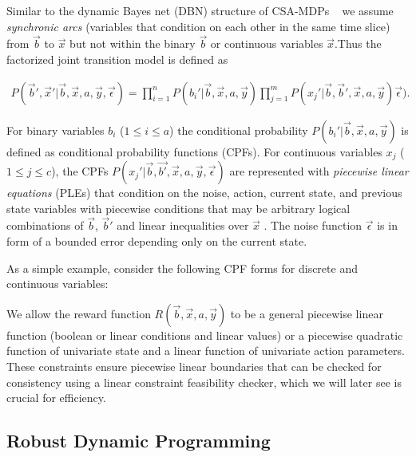  
Similar to the dynamic Bayes net (DBN) structure of CSA-MDPs ~\cite{sdp_aaai} 
we assume \emph{synchronic arcs} (variables that condition on each
other in the same time slice) from $\vec{b}$ to $\vec{x}$ but not within the binary $\vec{b}$ or continuous variables $\vec{x}$.Thus the factorized joint transition model is defined as

{\footnotesize
\begin{align}
 P(\vec{b}',\vec{x}'|\vec{b},\vec{x}, a,\vec{y},\vec{\epsilon}) = \prod_{i=1}^n P(b_i'|\vec{b},\vec{x} ,a,\vec{y}) 
\prod_{j=1}^m P(x_j'|\vec{b},\vec{b}',\vec{x},a,\vec{y}) \vec{\epsilon}).  \nonumber
\end{align}
}

For binary variables $b_i$ ($1 \leq i \leq a$) the conditional probability $P(b_i'|\vec{b},\vec{x},a,\vec{y})$ is defined as 
conditional probability functions (CPFs).  For continuous variables $x_j$ ($1 \leq j \leq c$), the CPFs
$P(x_j'|\vec{b},\vec{b'},\vec{x},a,\vec{y},\vec{\epsilon})$ are represented with \emph{piecewise linear equations} (PLEs) that condition on the
noise, action, current state, and previous state variables with piecewise conditions that may be arbitrary logical combinations of $\vec{b}$, $\vec{b}'$  and linear inequalities over $\vec{x}$ .  The noise function $\vec{\epsilon}$ is in form of a bounded error depending only on the current state. 

As a simple example, consider the following CPF forms for discrete and continuous variables: 

We allow the reward function $R(\vec{b},\vec{x},a,\vec{y})$ to be a general piecewise linear function (boolean or linear conditions
and linear values) or a piecewise quadratic function of univariate state and a linear function of univariate action parameters. 
These constraints ensure piecewise linear boundaries that can be checked for consistency using a linear constraint feasibility checker, which we will later see is crucial for efficiency.

\subsection{Robust Dynamic Programming}